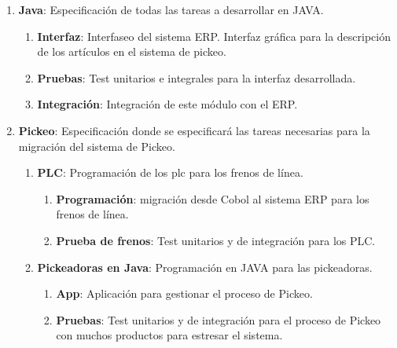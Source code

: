 \documentclass{article}
\begin{document}
\begin{enumerate}
		\item \textbf{Java}: Especificación de todas las tareas a desarrollar en JAVA.

			\begin{enumerate}[label*=\arabic*.]

				\item \textbf{Interfaz}: Interfaseo del sistema ERP. Interfaz gráfica para la descripción de los artículos en el sistema de pickeo.
			
				\item \textbf{Pruebas}: Test unitarios e integrales para la interfaz desarrollada.

				\item \textbf{Integración}: Integración de este módulo con el ERP.

			\end{enumerate}

		\item \textbf{Pickeo}: Especificación donde se especificará las tareas necesarias para la migración del sistema de Pickeo.

			\begin{enumerate}[label*=\arabic*.]

				\item \textbf{PLC}: Programación de los plc para los frenos de línea.

					\begin{enumerate}[label*=\arabic*.]
						\itemsep=3pt \topsep=0pt \partopsep=0pt \parskip=0pt \parsep=0pt

						\item \textbf{Programación}: migración desde Cobol al sistema ERP para los frenos de línea.

						\item \textbf{Prueba de frenos}: Test unitarios y de integración para los PLC.

					\end{enumerate}

				\item \textbf{Pickeadoras en Java}: Programación en JAVA para las pickeadoras.

					\begin{enumerate}[label*=\arabic*.]
						\itemsep=3pt \topsep=0pt \partopsep=0pt \parskip=0pt \parsep=0pt

						\item \textbf{App}: Aplicación para gestionar el proceso de Pickeo.

						\item \textbf{Pruebas}: Test unitarios y de integración para el proceso de Pickeo con muchos productos para estresar el sistema.


\end{enumerate}
\end{enumerate}
\end{enumerate}
\end{document}
